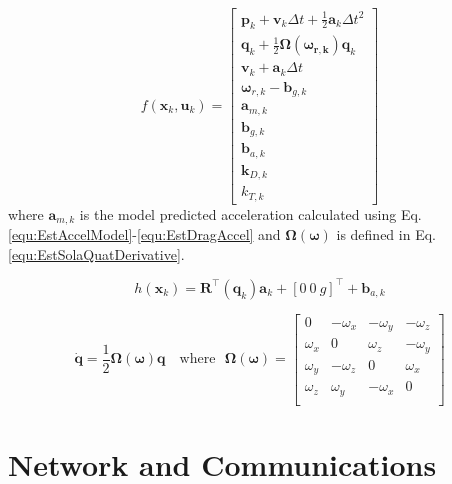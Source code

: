 \documentclass{report_template_oxford}
\begin{document}
\begin{equation} \label{equ:EstEKFf}
        f(\mathbf{x}_k,\mathbf{u}_k) =  \begin{bmatrix}
        \mathbf{p}_k + \mathbf{v}_k \Delta t + \frac{1}{2} \mathbf{a}_k \Delta t ^2 \\
        \mathbf{q}_k + \frac{1}{2}\boldsymbol{\Omega}(\boldsymbol{\omega_{r,k}})\mathbf{q}_k \\
        \mathbf{v}_k + \mathbf{a}_k \Delta t \\
        \boldsymbol{\omega}_{r,k} - \mathbf{b}_{g,k}\\
        \mathbf{a}_{m,k} \\
        \mathbf{b}_{g,k} \\
        \mathbf{b}_{a,k} \\
        \mathbf{k}_{D,k} \\ 
        k_{T,k}
    \end{bmatrix} 
\end{equation}
where $\mathbf{a}_{m,k}$ is the model predicted acceleration calculated using Eq.\ref{equ:EstAccelModel}-\ref{equ:EstDragAccel} and $\boldsymbol{\Omega}(\boldsymbol{\omega})$ is defined in Eq.\ref{equ:EstSolaQuatDerivative}.

\begin{equation}\label{equ:EstEKFh}
    h(\mathbf{x}_k) =  \mathbf{R}^\top(\mathbf{q}_k)\mathbf{a}_k + [0 \ 0 \ g]^\top + \mathbf{b}_{a,k}
\end{equation}

\begin{equation}\label{equ:EstSolaQuatDerivative}
    \dot{\mathbf{q}} = \frac{1}{2} \boldsymbol{\Omega}(\boldsymbol{\omega})\mathbf{q}
    \quad
    \text{where}
    \ \ \
    \boldsymbol{\Omega}(\boldsymbol{\omega}) = \begin{bmatrix}
        0 & -\omega_x & -\omega_y & -\omega_z \\
        \omega_x & 0 & \omega_z & -\omega_y \\ 
        \omega_y & -\omega_z & 0 & \omega_x \\ 
        \omega_z & \omega_y & -\omega_x &  0\\ 
    \end{bmatrix}
\end{equation}






\newpage

\section{Network and Communications}
\label{network}
\end{document}
